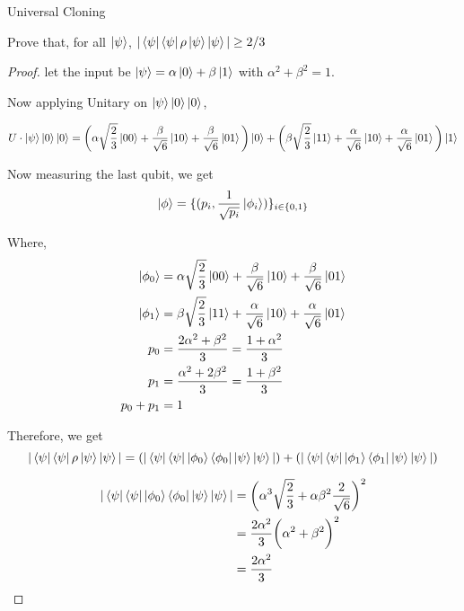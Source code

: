 \begin{solution}{Universal Cloning}\label{ques:x}
    \begin{question}
    Prove that, for all $\ket{\psi}$, $|\bra{\psi}\bra{\psi}\rho\ket{\psi}\ket{\psi}|\geq 2/3$
    \end{question}
    \tcblower{}
    \begin{proof}

    let the input be $\ket{\psi} = \alpha \ket{0}+\beta\ket{1}$ with $\alpha^2+\beta^2=1$.

    Now applying Unitary on $\ket{\psi}\ket{0}\ket{0}$,

    \[U\cdot\ket{\psi}\ket{0}\ket{0} = \bigg(\alpha\sqrt{\frac{2}{3}}\ket{00} + \frac{\beta}{\sqrt{6}}\ket{10}+ \frac{\beta}{\sqrt{6}}\ket{01}\bigg)\ket{0} + \bigg(\beta\sqrt{\frac{2}{3}}\ket{11} + \frac{\alpha}{\sqrt{6}}\ket{10}+ \frac{\alpha}{\sqrt{6}}\ket{01}\bigg)\ket{1}\]

    Now measuring the last qubit, we get 
    \begin{equation*}
        \ket{\phi} = \{(p_i,\frac{1}{\sqrt{p_i}}\ket{\phi_i})\}_{i\in\{0, 1\}}
    \end{equation*}

    Where,
    \begin{equation*}
    \begin{split}
        \ket{\phi_0} &= \alpha\sqrt{\frac{2}{3}}\ket{00} + \frac{\beta}{\sqrt{6}}\ket{10}+ \frac{\beta}{\sqrt{6}}\ket{01}\\
        \ket{\phi_1} &= \beta\sqrt{\frac{2}{3}}\ket{11} + \frac{\alpha}{\sqrt{6}}\ket{10}+ \frac{\alpha}{\sqrt{6}}\ket{01}\\
        p_0 &= \frac{2\alpha^2+\beta^2}{3} = \frac{1+\alpha^2}{3}\\
        p_1 &= \frac{\alpha^2+2\beta^2}{3}= \frac{1+\beta^2}{3}\\
        p_0 + p_1 &=1
    \end{split}
    \end{equation*}

    Therefore, we get 
    \[|\bra{\psi}\bra{\psi}\rho\ket{\psi}\ket{\psi}| = (|\bra{\psi}\bra{\psi}\ket{\phi_0}\bra{\phi_0}\ket{\psi}\ket{\psi}|) +(|\bra{\psi}\bra{\psi}\ket{\phi_1}\bra{\phi_1}\ket{\psi}\ket{\psi}|)\]

    \begin{equation*}
        \begin{split}
            |\bra{\psi}\bra{\psi}\ket{\phi_0}\bra{\phi_0}\ket{\psi}\ket{\psi}|&=\bigg(\alpha^3\sqrt{\frac{2}{3}} + \alpha\beta^2\frac{2}{\sqrt{6}}\bigg)^2\\
            &=\frac{2\alpha^2}{3}\bigg(\alpha^2+\beta^2\bigg)^2\\
            &= \frac{2\alpha^2}{3}
        \end{split}
    \end{equation*}


\end{proof}
\end{solution}
